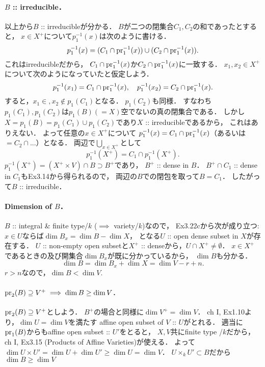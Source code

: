 \documentclass[a4paper]{jsarticle}
\begin{document}
    \paragraph{$B$ :: irreducible．}
    以上から$B$ :: irreducibleが分かる．
    $B$が二つの閉集合$C_1, C_2$の和であったとすると，
    $x \in X^+$について$p_1^{-1}(x)$は次のように書ける．
    \[ p_1^{-1}(x)=(C_1 \cap \operatorname{pr}_1^{-1}(x)) \cup (C_2 \cap \operatorname{pr}_1^{-1}(x)). \]
    これはirreducibleだから，
    $C_1 \cap \operatorname{pr}_1^{-1}(x)$か$C_2 \cap \operatorname{pr}_1^{-1}(x)$に一致する．
    $x_1, x_2 \in X^+$について次のようになっていたと仮定しよう．
    \[
        p_1^{-1}(x_1)=C_1 \cap \operatorname{pr}_1^{-1}(x),~~~
        p_1^{-1}(x_2)=C_2 \cap \operatorname{pr}_1^{-1}(x).
    \]
    すると，$x_1 \in, x_2 \not \in p_1(C_1)$となる．
    $p_1(C_2)$も同様．
    すなわち$p_1(C_1), p_1(C_2)$は$p_1(B)(=X)$空でないの真の閉集合である．
    しかし$X=p_1(B)=p_1(C_1) \cup p_1(C_2)$であり$X$ :: irreducibleであるから，
    これはありえない．
    よって任意の$x \in X^+$について
    $p_1^{-1}(x)=C_1 \cap \operatorname{pr}_1^{-1}(x)$（あるいは$=C_2 \cap$...）となる．
    両辺で$\bigcup_{x \in X^+}$として
    \[ p_1^{-1}(X^+)=C_1 \cap p_1^{-1}(X^+). \]
    $p_1^{-1}(X^+)=(X^+ \times V) \cap B \supset B^+$であり，
    $B^+$ :: dense in $B$．
    $B^+ \cap C_1$ :: dense in $C_1$もEx3.14から得られるので，
    両辺の$B$での閉包を取って$B=C_1$．
    したがって$B$ :: irreducible．

    \paragraph{Dimension of $B$．}
    $B$ :: integral \& finite type/$k$ ($\implies$ variety/$k$)なので，
    Ex3.22cから次が成り立つ:
    $x \in U$ならば$\dim B_x=\dim B-\dim X$，
    となる$U$ :: open dense subset in $X$が存在する．
    $U$ :: non-empty open subsetと$X^+$ :: denseから，$U \cap X^+ \neq \emptyset$．
    $x \in X^+$であるときの及び開集合$\dim B_x$が既に分かっているから，
    $\dim B$も分かる．
    \[ \dim B=\dim B_x+\dim X=\dim V-r+n. \]
    $r>n$なので，$\dim B<\dim V$.

    \paragraph{$\operatorname{pr}_2(B) \supseteq V^+ \implies \dim B \geq \dim V$.}
    $\operatorname{pr}_2(B) \supseteq V^+$としよう．
    $B^+$の場合と同様に$\dim V^+=\dim V$．
    ch I, Ex1.10より，$\dim U=\dim V$を満たす
    affine open subset of $V$ :: $U$がとれる．
    適当に$\operatorname{pr}_1(B)$からもaffine open subset ::  $U'$をとると，
    $X, V$共にfinite type /$k$だから，
    ch I, Ex3.15 (Products of Affine Varieties)が使える．
    よって$\dim U \times U'=\dim U+\dim U' \geq \dim U=\dim V$．
    $U \times_k U' \subset B$だから$\dim B \geq \dim V$
    
\end{document}
